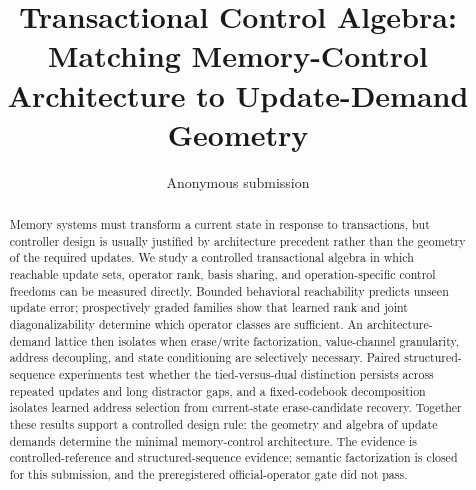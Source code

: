 \documentclass[11pt]{article}
\title{Transactional Control Algebra: Matching Memory-Control Architecture
to Update-Demand Geometry}
\author{Anonymous submission}
\begin{document}
\maketitle

\begin{abstract}
Memory systems must transform a current state in response to transactions, but
controller design is usually justified by architecture precedent rather than
the geometry of the required updates. We study a controlled transactional
algebra in which reachable update sets, operator rank, basis sharing, and
operation-specific control freedoms can be measured directly. Bounded
behavioral reachability predicts unseen update error; prospectively graded
families show that learned rank and joint diagonalizability determine which
operator classes are sufficient. An architecture-demand lattice then isolates
when erase/write factorization, value-channel granularity, address
decoupling, and state conditioning are selectively necessary. Paired
structured-sequence experiments test whether the tied-versus-dual distinction
persists across repeated updates and long distractor gaps, and a fixed-codebook
decomposition isolates learned address selection from current-state
erase-candidate recovery. Together these results support a controlled design
rule: the geometry and algebra of update demands determine the minimal
memory-control architecture. The evidence is controlled-reference and
structured-sequence evidence; semantic factorization is closed for this
submission, and the preregistered official-operator gate did not pass.
\end{abstract}













\appendix

\end{document}
